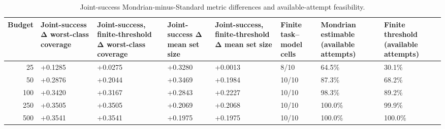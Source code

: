 \begin{table}[t]
\centering
\footnotesize
\begin{tabular}{rlllllll}
\toprule
Budget & Joint-success Δ worst-class coverage & Joint-success, finite-threshold Δ worst-class coverage & Joint-success Δ mean set size & Joint-success, finite-threshold Δ mean set size & Finite task–model cells & Mondrian estimable (available attempts) & Finite threshold (available attempts) \\
\midrule
25 & +0.1285 & +0.0275 & +0.3280 & +0.0013 & 8/10 & 64.5\% & 30.1\% \\
50 & +0.2876 & +0.2044 & +0.3469 & +0.1984 & 10/10 & 87.3\% & 68.2\% \\
100 & +0.3420 & +0.3167 & +0.2843 & +0.2227 & 10/10 & 98.3\% & 89.2\% \\
250 & +0.3505 & +0.3505 & +0.2069 & +0.2068 & 10/10 & 100.0\% & 99.9\% \\
500 & +0.3541 & +0.3541 & +0.1975 & +0.1975 & 10/10 & 100.0\% & 100.0\% \\
\bottomrule
\end{tabular}
\caption{Joint-success Mondrian-minus-Standard metric differences and available-attempt feasibility.}
\label{tab:h5}
\end{table}
